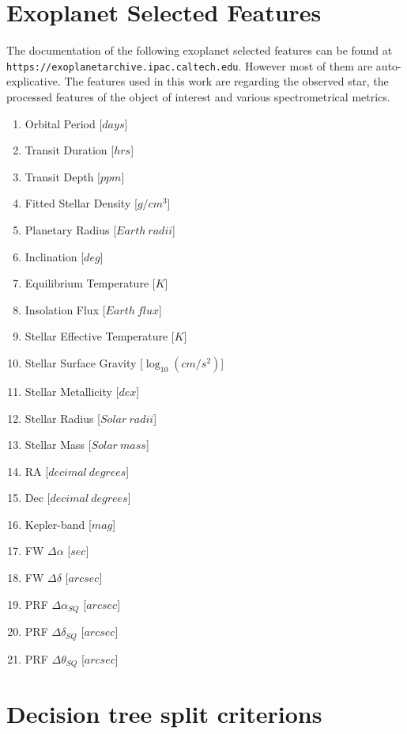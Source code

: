 \documentclass[11pt, a4paper]{article}
\begin{document}
\section{Exoplanet Selected Features}
  The documentation of the following exoplanet selected features can be found at \texttt{https://exoplanetarchive.ipac.caltech.edu}.
  However most of them are auto-explicative.
  The features used in this work are regarding the observed star, the processed features of the object of interest and various spectrometrical metrics.
  \begin{multicols}{2}
    \label{appendix:features}
    \begin{enumerate}
      \item Orbital Period [$days$]
      \item Transit Duration [$hrs$]
      \item Transit Depth [$ppm$]
      \item Fitted Stellar Density [$g/cm^{3}$]
      \item Planetary Radius [$Earth\:radii$]
      \item Inclination [$deg$]
      \item Equilibrium Temperature [$K$]
      \item Insolation Flux [$Earth\:flux$]
      \item Stellar Effective Temperature [$K$]
      \item Stellar Surface Gravity [$\log_{10}(cm/s^{2})$]
      \item Stellar Metallicity [$dex$]
      \item Stellar Radius [$Solar\:radii$]
      \item Stellar Mass [$Solar\:mass$]
      \item RA [$decimal\:degrees$]
      \item Dec [$decimal\:degrees$]
      \item Kepler-band [$mag$]
      \item FW $\Delta\alpha$ [$sec$]
      \item FW $\Delta\delta$ [$arcsec$]
      \item PRF $\Delta\alpha_{SQ}$ [$arcsec$]
      \item PRF $\Delta\delta_{SQ}$ [$arcsec$]
      \item PRF $\Delta\theta_{SQ}$ [$arcsec$]
    \end{enumerate}
  \end{multicols}

\section{Decision tree split criterions}
  \label{appendix:splitcriterions}
\end{document}
